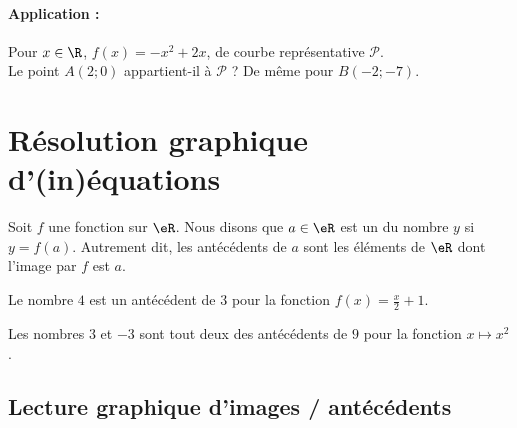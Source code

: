 \paragraph{Application :} 
\begin{minipage}[t]{0.8\linewidth}
  Pour $x\in\R$, $f(x)=-x^2+2x$, de courbe représentative
  $\mathscr{P}$.\\
  Le point $A(2;0)$ appartient-il à $\mathscr{P}$ ? De même pour
  $B(-2;-7)$.
  \vspace{4cm}
\end{minipage}

\section{Résolution graphique d'(in)équations} 

\begin{definition}
    Soit \( f\) une fonction sur \( \eR\). Nous disons que \( a\in \eR\) est un  du nombre \( y\) si \( y=f(a)\). Autrement dit, les antécédents de \( a\) sont les éléments de \( \eR\) dont l'image par \( f\) est \( a\).
\end{definition}

\begin{example}
    Le nombre \( 4\) est un antécédent de \( 3\) pour la fonction \( f(x)=\frac{ x }{ 2 }+1\).
\end{example}

\begin{example}
    Les nombres \( 3\) et \( -3\) sont tout deux des antécédents de \( 9\) pour la fonction \( x\mapsto x^2\).
\end{example}

\subsection{Lecture graphique d'images / antécédents}

